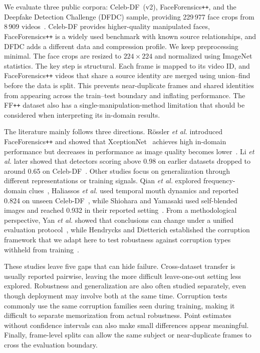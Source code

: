 \documentclass[journal,onecolumn]{IEEEtran}
\newcommand{\celebdf}{Celeb-DF}
\begin{document}
We evaluate three public corpora: \celebdf~(v2), FaceForensics\texttt{++}, and the Deepfake Detection Challenge (DFDC) sample, providing 229\,977 face crops from 8\,909 videos~\cite{li2020celebdf,rossler2019faceforensics,dolhansky2020dfdc}. \celebdf{} provides higher-quality manipulated faces, FaceForensics\texttt{++} is a widely used benchmark with known source relationships, and DFDC adds a different data and compression profile. We keep preprocessing minimal. The face crops are resized to $224 \times 224$ and normalized using ImageNet statistics. The key step is structural. Each frame is mapped to its video ID, and FaceForensics\texttt{++} videos that share a source identity are merged using union--find before the data is split. This prevents near-duplicate frames and shared identities from appearing across the train--test boundary and inflating performance. The FF\texttt{++} dataset also has a single-manipulation-method limitation that should be considered when interpreting its in-domain results.

The literature mainly follows three directions. R{\"o}ssler \textit{et al.} introduced FaceForensics\texttt{++} and showed that XceptionNet~\cite{chollet2017xception} achieves high in-domain performance but decreases in performance as image quality becomes lower~\cite{rossler2019faceforensics}. Li \textit{et al.} later showed that detectors scoring above 0.98 on earlier datasets dropped to around 0.65 on \celebdf{}~\cite{li2020celebdf}. Other studies focus on generalization through different representations or training signals. Qian \textit{et al.} explored frequency-domain clues~\cite{qian2020f3net}, Haliassos \textit{et al.} used temporal mouth dynamics and reported 0.824 on unseen \celebdf{}~\cite{haliassos2021lips}, while Shiohara and Yamasaki used self-blended images and reached 0.932 in their reported setting~\cite{shiohara2022sbi}. From a methodological perspective, Yan \textit{et al.} showed that conclusions can change under a unified evaluation protocol~\cite{yan2023deepfakebench}, while Hendrycks and Dietterich established the corruption framework that we adapt here to test robustness against corruption types withheld from training~\cite{hendrycks2019robustness}.

These studies leave five gaps that can hide failure. Cross-dataset transfer is usually reported pairwise, leaving the more difficult leave-one-out setting less explored. Robustness and generalization are also often studied separately, even though deployment may involve both at the same time. Corruption tests commonly use the same corruption families seen during training, making it difficult to separate memorization from actual robustness. Point estimates without confidence intervals can also make small differences appear meaningful. Finally, frame-level splits can allow the same subject or near-duplicate frames to cross the evaluation boundary.
\end{document}
